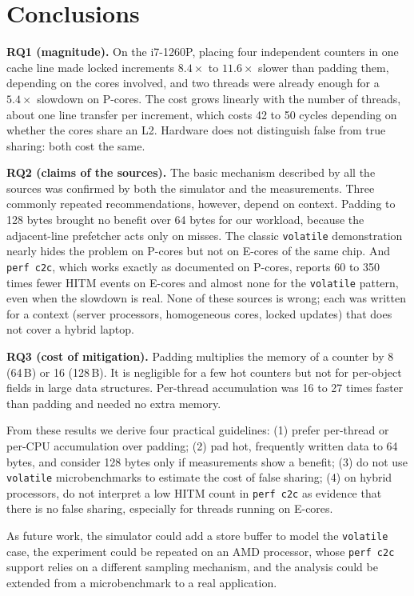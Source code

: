 \documentclass[journal]{IEEEtran}
\begin{document}
\section{Conclusions}
\label{sec:conclusions}
\textbf{RQ1 (magnitude).} On the i7-1260P, placing four independent
counters in one cache line made locked increments $8.4\times$ to $11.6\times$
slower than padding them, depending on the cores involved, and two threads were
already enough for a $5.4\times$ slowdown on P-cores. The cost grows linearly with
the number of threads, about one line transfer per increment, which costs
42 to 50 cycles depending on whether the cores share an L2. Hardware does not
distinguish false from true sharing: both cost the same.

\textbf{RQ2 (claims of the sources).} The basic mechanism described by all the
sources was confirmed by both the simulator and the measurements. Three
commonly repeated recommendations, however, depend on context. Padding to
128 bytes brought no benefit over 64 bytes for our workload, because the
adjacent-line prefetcher acts only on misses. The classic \texttt{volatile}
demonstration nearly hides the problem on P-cores but not on E-cores of the same
chip. And \texttt{perf c2c}, which works exactly as documented on P-cores,
reports 60 to 350 times fewer HITM events on E-cores and almost none for the
\texttt{volatile} pattern, even when the slowdown is real. None of these
sources is wrong; each was written for a context (server processors,
homogeneous cores, locked updates) that does not cover a hybrid laptop.

\textbf{RQ3 (cost of mitigation).} Padding multiplies the memory of a counter
by 8 (64\,B) or 16 (128\,B). It is negligible for a few hot counters but not for
per-object fields in large data structures. Per-thread accumulation was 16 to
27 times faster than padding and needed no extra memory.

From these results we derive four practical guidelines: (1) prefer per-thread or
per-CPU accumulation over padding; (2) pad hot, frequently written data to
64 bytes, and consider 128 bytes only if measurements show a benefit; (3) do not
use \texttt{volatile} microbenchmarks to estimate the cost of false sharing;
(4) on hybrid processors, do not interpret a low HITM count in
\texttt{perf c2c} as evidence that there is no false sharing, especially for
threads running on E-cores.

As future work, the simulator could add a store buffer to model the
\texttt{volatile} case, the experiment could be repeated on an AMD processor,
whose \texttt{perf c2c} support relies on a different sampling mechanism, and
the analysis could be extended from a microbenchmark to a real application.



\end{document}
